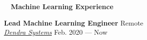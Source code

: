 \documentclass[a4paper,12pt]{article}
\newcommand{\resheading}[1]{{\hspace{-9pt} \colorbox{mygrey}{\begin{minipage}{\textwidth}{\textmd{~~\large \textbf{#1} \vphantom{p\^{E}}}}\end{minipage}}\vspace{6pt}} }
\newcommand{\ressubheading}[4]{{\begin{minipage}{\textwidth}
                                    \textbf{#1} \hfill #2 \\
                                    \textit{#3} \hfill #4 \\
\end{minipage}}}
\begin{document}
%


    \resheading{Machine Learning Experience}


    \ressubheading{Lead Machine Learning Engineer}{Remote}{\href{dendra.io}{Dendra Systems}}{Feb. 2020 --- Now}
\end{document}
